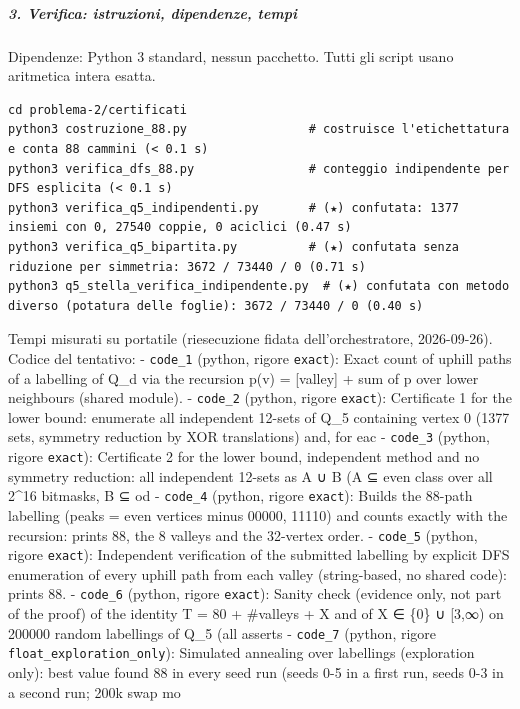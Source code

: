\documentclass[11pt,a4paper]{article}
\begin{document}
\subparagraph{3. Verifica: istruzioni, dipendenze,
tempi}\label{verifica-istruzioni-dipendenze-tempi}

Dipendenze: Python 3 standard, nessun pacchetto. Tutti gli script usano
aritmetica intera esatta.

\begin{verbatim}
cd problema-2/certificati
python3 costruzione_88.py                 # costruisce l'etichettatura e conta 88 cammini (< 0.1 s)
python3 verifica_dfs_88.py                # conteggio indipendente per DFS esplicita (< 0.1 s)
python3 verifica_q5_indipendenti.py       # (★) confutata: 1377 insiemi con 0, 27540 coppie, 0 aciclici (0.47 s)
python3 verifica_q5_bipartita.py          # (★) confutata senza riduzione per simmetria: 3672 / 73440 / 0 (0.71 s)
python3 q5_stella_verifica_indipendente.py  # (★) confutata con metodo diverso (potatura delle foglie): 3672 / 73440 / 0 (0.40 s)
\end{verbatim}

Tempi misurati su portatile (riesecuzione fidata dell'orchestratore,
2026-09-26). Codice del tentativo: - \texttt{code\_1} (python, rigore
\texttt{exact}): Exact count of uphill paths of a labelling of Q\_d via
the recursion p(v) = {[}valley{]} + sum of p over lower neighbours
(shared module). - \texttt{code\_2} (python, rigore \texttt{exact}):
Certificate 1 for the lower bound: enumerate all independent 12-sets of
Q\_5 containing vertex 0 (1377 sets, symmetry reduction by XOR
translations) and, for eac - \texttt{code\_3} (python, rigore
\texttt{exact}): Certificate 2 for the lower bound, independent method
and no symmetry reduction: all independent 12-sets as A ∪ B (A ⊆ even
class over all 2\^{}16 bitmasks, B ⊆ od - \texttt{code\_4} (python,
rigore \texttt{exact}): Builds the 88-path labelling (peaks = even
vertices minus 00000, 11110) and counts exactly with the recursion:
prints 88, the 8 valleys and the 32-vertex order. - \texttt{code\_5}
(python, rigore \texttt{exact}): Independent verification of the
submitted labelling by explicit DFS enumeration of every uphill path
from each valley (string-based, no shared code): prints 88. -
\texttt{code\_6} (python, rigore \texttt{exact}): Sanity check (evidence
only, not part of the proof) of the identity T = 80 + \#valleys + X and
of X ∈ \{0\} ∪ {[}3,∞) on 200000 random labellings of Q\_5 (all asserts
- \texttt{code\_7} (python, rigore \texttt{float\_exploration\_only}):
Simulated annealing over labellings (exploration only): best value found
88 in every seed run (seeds 0-5 in a first run, seeds 0-3 in a second
run; 200k swap mo
\end{document}
